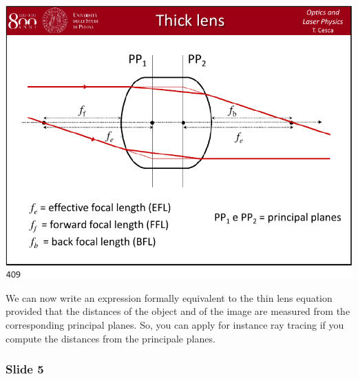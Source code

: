 \documentclass[../main/main.tex]{subfiles}
\begin{document}
\begin{minipage}[]{0.5\linewidth}
\centering
\includegraphics[page=4,width=1\textwidth]{../lessons/pdf_file/20_lecture.pdf}
\end{minipage}
\hspace{0.3cm}\vspace{0.3cm}
\begin{minipage}[c]{0.47\linewidth}

We can now write an expression formally equivalent to the thin lens equation provided that the distances of the object and of the image are measured from the corresponding principal planes.
So, you can apply for instance ray tracing if you compute the distances from the principale planes.

\end{minipage}

\subsubsection*{Slide 5}
\end{document}
